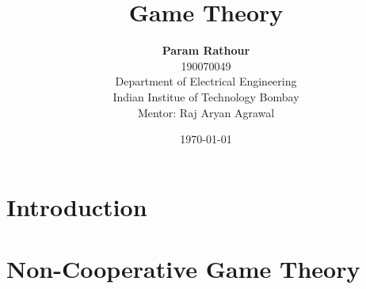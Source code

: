 \documentclass[a4paper,11pt]{article}
\title{Game Theory}
\author{%
    {\Large\textbf{Param Rathour}}\\[0.4em]
    {190070049}\\[0.4em]
    {Department of Electrical Engineering}\\[0.4em]
    {Indian Institue of Technology Bombay}\\[0.4em]
    {Mentor: Raj Aryan Agrawal}}
\date{\today}
\begin{document}


\setcounter{tocdepth}{2}
\tableofcontents
\newpage
{}
\part{Introduction}

\newpage
\part{Non-Cooperative Game Theory}








%  
\nocite{*}


\end{document}
